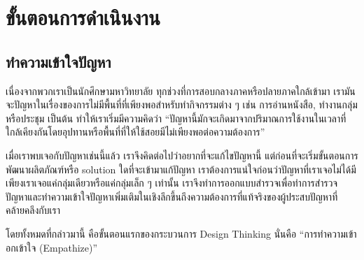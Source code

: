 \section{ขั้นตอนการดำเนินงาน}
\subsection{ทำความเข้าใจปัญหา}
เนื่องจากพวกเราเป็นนักศึกษามหาวิทยาลัย ทุกช่วงที่การสอบกลางภาคหรือปลายภาคใกล้เข้ามา เรามันจะปัญหาในเรื่องของการไม่มีพื้นที่ที่เพียงพอสำหรับทำกิจกรรมต่าง ๆ เช่น การอ่านหนังสือ, ทำงานกลุ่มหรือประชุม เป็นต้น ทำให้เราเริ่มมีความคิดว่า ``ปัญหานี้มักจะเกิดมาจากปริมาณการใช้งานในเวลาที่ใกล้เคียงกันโดยอุปทานหรือพื้นที่ที่ให้ใช้สอยมีไม่เพียงพอต่อความต้องการ''

เมื่อเราพบเจอกับปัญหาเช่นนี้แล้ว เราจึงคิดต่อไปว่าอยากที่จะแก้ไขปัญหานี้ แต่ก่อนที่จะเริ่มขั้นตอนการพัฒนาผลิตภัณฑ์หรือ solution ใดที่จะเข้ามาแก้ปัญหา เราต้องการแน่ใจก่อนว่าปัญหาที่เราเจอไม่ได้มีเพียงเราเจอแค่กลุ่มเดียวหรือแค่กลุ่มเล็ก ๆ เท่านั้น เราจึงทำการออกแบบสำรวจเพื่อทำการสำรวจปัญหาและทำความเข้าใจปัญหาเพิ่มเติมในเชิงลึกขึ้นถึงความต้องการที่แท้จริงของผู้ประสบปัญหาที่คล้ายคลึงกับเรา

โดยทั้งหมดที่กล่าวมานี้ คือขั้นตอนแรกของกระบวนการ Design Thinking นั่นคือ ``การทำความเข้าอกเข้าใจ (Empathize)''

